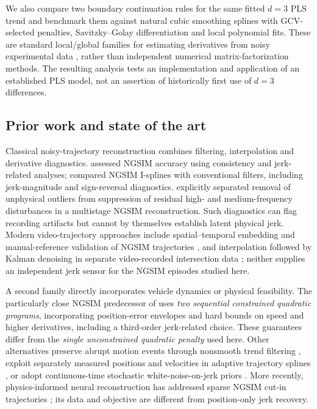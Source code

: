 We also compare two boundary continuation rules for the same fitted $d=3$ PLS trend and benchmark them against natural cubic smoothing splines with GCV-selected penalties, Savitzky--Golay differentiation and local polynomial fits. These are standard local/global families for estimating derivatives from noisy experimental data \citep{ahnert2007}, rather than independent numerical matrix-factorization methods. The resulting analysis tests an implementation and application of an established PLS model, not an assertion of historically first use of $d=3$ differences.

\subsection{Prior work and state of the art}
Classical noisy-trajectory reconstruction combines filtering,
interpolation and derivative diagnostics. \citet{punzo2011} assessed
NGSIM accuracy using consistency and jerk-related analyses;
\citet{marczak2012} compared NGSIM I-splines with conventional
filters, including jerk-magnitude and sign-reversal diagnostics.
\citet{montanino2013} explicitly separated removal of unphysical
outliers from suppression of residual high- and medium-frequency
disturbances in a multistage NGSIM reconstruction. Such diagnostics
can flag recording artifacts but cannot by themselves establish
latent physical jerk. Modern video-trajectory approaches include
spatial--temporal embedding and manual-reference validation of
NGSIM trajectories \citep{zhang2024ngsim}, and interpolation
followed by Kalman denoising in separate video-recorded
intersection data \citep{ding2026}; neither supplies an
independent jerk sensor for the NGSIM episodes studied here.

A second family directly incorporates vehicle dynamics or
physical feasibility. The particularly close NGSIM predecessor
of \citet{fan2024} uses \emph{two sequential constrained quadratic
programs}, incorporating position-error envelopes and hard bounds
on speed and higher derivatives, including a third-order
jerk-related choice. These guarantees differ from the
\emph{single unconstrained quadratic penalty} used here.
Other alternatives preserve abrupt motion events through
nonsmooth trend filtering \citep{zhu2024}, exploit separately
measured positions and velocities in adaptive trajectory splines
\citep{cao2021}, or adopt continuous-time stochastic
white-noise-on-jerk priors \citep{tang2019}. More recently,
physics-informed neural reconstruction has addressed sparse
NGSIM cut-in trajectories \citep{xie2026}; its data and objective
are different from position-only jerk recovery.

